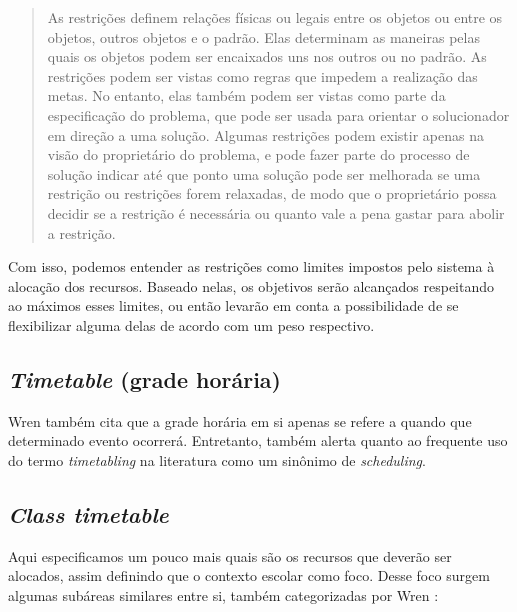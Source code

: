         
        \begin{quote}\footnotesize
            As restrições definem relações físicas ou legais entre os objetos ou entre os objetos, outros objetos e o padrão. Elas determinam as maneiras pelas quais os objetos podem ser encaixados uns nos outros ou no padrão. As restrições podem ser vistas como regras que impedem a realização das metas. No entanto, elas também podem ser vistas como parte da especificação do problema, que pode ser usada para orientar o solucionador em direção a uma solução. Algumas restrições podem existir apenas na visão do proprietário do problema, e pode fazer parte do processo de solução indicar até que ponto uma solução pode ser melhorada se uma restrição ou restrições forem relaxadas, de modo que o proprietário possa decidir se a restrição é necessária ou quanto vale a pena gastar para abolir a restrição.
        \end{quote}
        
        Com isso, podemos entender as restrições como limites impostos pelo sistema à alocação dos recursos. Baseado nelas, os objetivos serão alcançados respeitando ao máximos esses limites, ou então levarão em conta a possibilidade de se flexibilizar alguma delas de acordo com um peso respectivo.
    
    \subsection{\textit{Timetable} (grade horária)}
    
        Wren \cite{WREN1996} também cita que a grade horária em si apenas se refere a quando que determinado evento ocorrerá. Entretanto, também alerta quanto ao frequente uso do termo \textit{timetabling} na literatura como um sinônimo de \textit{scheduling}.
    
    \subsection{\textit{Class timetable}}
    
        Aqui especificamos um pouco mais quais são os recursos que deverão ser alocados, assim definindo que o contexto escolar como foco. Desse foco surgem algumas subáreas similares entre si, também categorizadas por Wren \cite{WREN1996}:
        
